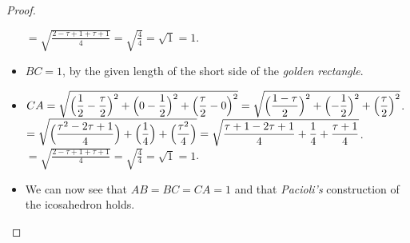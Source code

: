 \documentclass[12pt]{article}
\theoremstyle{plain}
\begin{document}
\begin{proof}
\begin{itemize}
    \subitem $ \displaystyle = \sqrt{ \frac{2 -\tau + 1 + \tau + 1}{4} } = \sqrt{\frac{4}{4}} = \sqrt{1} = 1 $.
    \item $ BC = 1 $, by the given length of the short side of the \textit{golden rectangle}.
    \item $ \displaystyle CA = \sqrt{\Bigl( \frac{1}{2} - \frac{\tau}{2} \Bigr)^2 + \Bigl( 0 - \frac{1}{2} \Bigr)^2 + \Bigl( \frac{\tau}{2} - 0 \Bigr)^2} = \sqrt{\Bigl( \frac{1 - \tau}{2} \Bigr)^2 + \Bigl( - \frac{1}{2} \Bigr)^2 + \Bigl( \frac{\tau}{2} \Bigr)^2} $.
    \subitem $ \displaystyle = \sqrt{\Bigl( \frac{\tau^2 -2\tau + 1}{4} \Bigr) + \Bigl( \frac{1}{4} \Bigr) + \Bigl( \frac{\tau^2}{4} \Bigr)} = \sqrt{ \frac{\tau + 1 -2\tau + 1}{4} + \frac{1}{4} + \frac{\tau + 1}{4} } $.
    \subitem $ \displaystyle = \sqrt{ \frac{2 -\tau + 1 + \tau + 1}{4} } = \sqrt{\frac{4}{4}} = \sqrt{1} = 1 $.
    \item We can now see that $AB=BC=CA=1$ and that \textit{Pacioli's} construction of the icosahedron holds.
  \end{itemize} 
\end{proof}
\end{document}
